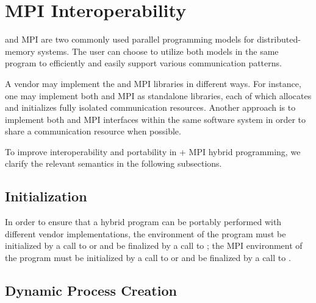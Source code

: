 

\section{MPI Interoperability}

\openshmem and \ac{MPI} are two commonly used parallel programming models for
distributed-memory systems. The user can choose to utilize both models in the same program
to efficiently and easily support various communication patterns.

A vendor may implement the \openshmem and \ac{MPI} libraries in different ways. For
instance, one may implement both \openshmem and \ac{MPI} as standalone libraries,
each of which allocates and initializes fully isolated communication
resources.
Another approach
is to implement both \openshmem and \ac{MPI} interfaces within the
same software system in order to share a communication resource when possible.

To improve interoperability and portability in \openshmem + \ac{MPI} hybrid
programming, we clarify the relevant semantics in the following subsections.


\subsection{Initialization}
In order to ensure that a hybrid program can be portably performed with different vendor
implementations, the \openshmem environment of the program must be initialized by
a call to  or  and be finalized by
a call to ; the \ac{MPI} environment of the program must be initialized
by a call to  or  and be finalized by a
call to .



\subsection{Dynamic Process Creation}
\label{subsec:interoperability:mpmd}

